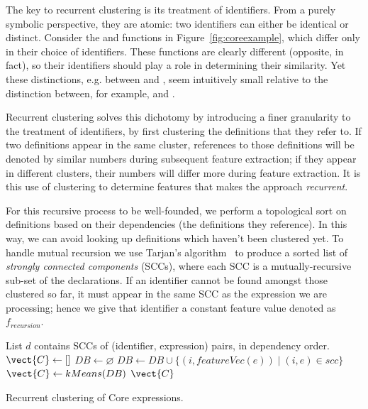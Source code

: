 The key to recurrent clustering is its treatment of identifiers. From a purely
symbolic perspective, they are atomic: two identifiers can either be identical
or distinct. Consider the  and  functions in
Figure~\ref{fig:coreexample}, which differ only in their choice of identifiers.
These functions are clearly different (opposite, in fact), so their identifiers
should play a role in determining their similarity. Yet these distinctions, e.g.
between  and , seem intuitively small relative to the
distinction between, for example,  and .

Recurrent clustering solves this dichotomy by introducing a finer granularity to
the treatment of identifiers, by first clustering the definitions that they
refer to. If two definitions appear in the same cluster, references to those
definitions will be denoted by similar numbers during subsequent feature
extraction; if they appear in different clusters, their numbers will differ more
during feature extraction. It is this use of clustering to determine features
that makes the approach \emph{recurrent}.

For this recursive process to be well-founded, we perform a topological sort on
definitions based on their dependencies (the definitions they reference). In
this way, we can avoid looking up definitions which haven't been clustered
yet. To handle mutual recursion we use Tarjan's algorithm~\cite{tarjan1972depth}
to produce a sorted list of \emph{strongly connected components} (SCCs), where
each SCC is a mutually-recursive sub-set of the declarations. If an identifier
cannot be found amongst those clustered so far, it must appear in the same SCC
as the expression we are processing; hence we give that identifier a constant
feature value denoted as $f_{recursion}$.

\begin{algorithm}
  \begin{algorithmic}[1]
    \Require List $d$ contains SCCs of (identifier, expression) pairs, in
    dependency order.
      \State $\vect{C} \gets []$
      \State $DB \gets \varnothing$
        \State $DB \gets DB \cup \{(i, featureVec(e)) \mid (i, e) \in scc\}$
        \State $\vect{C} \gets kMeans(DB)$
      \EndFor
      \Return $\vect{C}$
    \EndProcedure
  \end{algorithmic}
  \caption{Recurrent clustering of Core expressions.}
  \label{alg:recurrent}
\end{algorithm}

